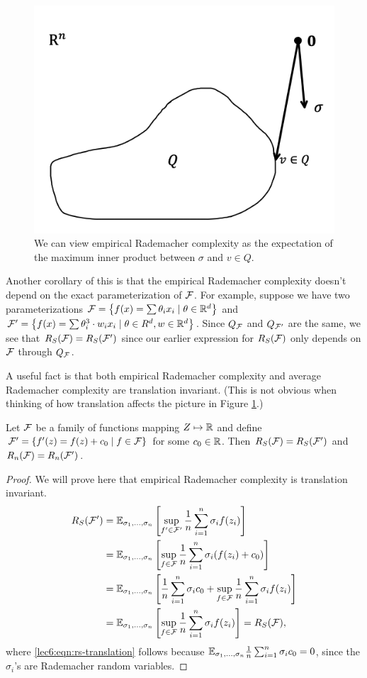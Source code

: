 \begin{figure}[h!]
\begin{center}
\includegraphics[width=.5\textwidth]{figures/remark2.png}
\end{center}
\caption{We can view empirical Rademacher complexity as the expectation of the maximum inner product between $\sigma$ and $v\in Q$.}
\label{lec6:fig:rs-innerprod}
\end{figure}

Another corollary of this is that the empirical Rademacher complexity doesn't depend on the exact parameterization of $\mathcal F$. For example, suppose we have two parameterizations $\mathcal F = \left\{f(x)=\sum \theta_{i} x_{i} \mid \theta \in \mathbb{R}^{d}\right\}$ and $\mathcal F' = \left\{f(x)=\sum \theta_{i}^{3} \cdot w_{i} x_{i} \mid \theta \in R^{d}, w \in \mathbb{R}^{d}\right\}$. Since $Q_\mathcal F$ and $Q_{\mathcal F'}$ are the same, we see that $R_S(\mathcal F) = R_S(\mathcal F')$ since our earlier expression for $R_S(\mathcal F)$ only depends on $\mathcal F$ through $Q_\mathcal F$. 

A useful fact is that both empirical Rademacher complexity and average Rademacher complexity are translation invariant. (This is not obvious when thinking of how translation affects the picture in Figure \ref{lec6:fig:rs-innerprod}.)

\begin{proposition}
Let $\mathcal F$ be a family of functions mapping $Z \mapsto \mathbb R$ and define $\mathcal F' = \{f'(z) = f(z) + c_0\mid f\in \mathcal F\}$ for some $c_0\in\mathbb R$. Then $R_S(\mathcal F) = R_S(\mathcal F')$ and $R_n(\mathcal F) = R_n(\mathcal F')$.
\end{proposition}

\begin{proof}
We will prove here that empirical Rademacher complexity is translation invariant.
\begin{align}
R_S(\mathcal F') &= \mathbb{E}_{\sigma_1,\dots, \sigma_n} \left[ \sup_{f'\in \mathcal F'} \frac{1}{n} \sum^n_{i=1} \sigma_i f(z_i) \right] \\
&= \mathbb{E}_{\sigma_1,\dots, \sigma_n} \left[ \sup_{f\in \mathcal F} \frac{1}{n} \sum^n_{i=1} \sigma_i (f(z_i)+c_0) \right] \\
&= \mathbb{E}_{\sigma_1,\dots, \sigma_n} \left[ \frac{1}{n} \sum^n_{i=1} \sigma_i c_0 + \sup_{f\in \mathcal F} \frac{1}{n} \sum^n_{i=1} \sigma_i f(z_i) \right] \\
&= \mathbb{E}_{\sigma_1,\dots, \sigma_n} \left[\sup_{f\in \mathcal F} \frac{1}{n} \sum^n_{i=1} \sigma_i f(z_i) \right] = R_S(\mathcal F), \label{lec6:eqn:rs-translation}
\end{align}
where \eqref{lec6:eqn:rs-translation} follows because $\mathbb{E}_{\sigma_1,\dots,\sigma_n} \frac{1}{n}\sum_{i=1}^n \sigma_i c_0 = 0$, since the $\sigma_i$'s are Rademacher random variables.
\end{proof}

